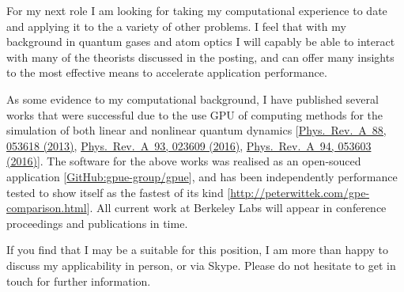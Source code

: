 \documentclass[11pt,a4paper,unicode]{moderncv}
\begin{document}
{    For my next role I am looking for taking my computational experience to date and applying it to the a variety of other problems. I feel that with my background in quantum gases and atom optics I will capably be able to interact with many of the theorists discussed in the posting, and can offer many insights to the most effective means to accelerate application performance. 


    As some evidence to my computational background, I have published several works that were successful due to the use GPU of computing methods for the simulation of both linear and nonlinear quantum dynamics [\href{http://journals.aps.org/pra/abstract/10.1103/PhysRevA.88.053618}{Phys.~Rev.~A~88, 053618 (2013)}, \href{https://journals.aps.org/pra/abstract/10.1103/PhysRevA.93.023609}{Phys.~Rev.~A~93, 023609 (2016)}, \href{https://journals.aps.org/pra/abstract/10.1103/PhysRevA.94.053603}{Phys.~Rev.~A~94, 053603 (2016)}]. The software for the above works was realised as an open-souced application [\href{https://github.com/gpue-group/gpue}{GitHub:gpue-group/gpue}], and has been independently performance tested to show itself as the fastest of its kind [\href{http://peterwittek.com/gpe-comparison.html}{http://peterwittek.com/gpe-comparison.html}]. All current work at Berkeley Labs will appear in conference proceedings and publications in time.

    If you find that I may be a suitable for this position, I am more than happy to discuss my applicability in person, or via Skype. Please do not hesitate to get in touch for further information.
    \vspace{-0.15cm}
}

\makeletterclosing
\end{document}
